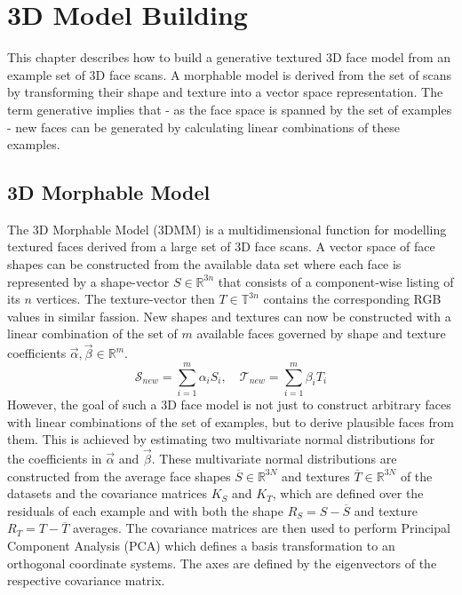 \chapter{3D Model Building}
\label{chap:modelbuilding}
This chapter describes how to build a generative textured 3D face model from an example set of 3D face scans. A morphable model is derived from the set of scans by transforming their shape and texture into a vector space representation. The term generative implies that - as the face space is spanned by the set of examples - new faces can be generated by calculating linear combinations of these examples. 

\section{3D Morphable Model}
The 3D Morphable Model (3DMM) \cite{3DMM} is a multidimensional function for modelling textured faces derived from a large set of 3D face scans. 
A vector space of face shapes can be constructed from the available data set where each face is represented by a shape-vector $S \in \mathbb{R}^{3n}$ that consists of a component-wise listing of its $n$ vertices. The texture-vector then $T \in
\mathbb{T}^{3n}$ contains the corresponding RGB values in similar fassion.
New shapes and textures can now be constructed with a linear combination of the set of $m$ available faces governed by shape and texture coefficients $\vec\alpha, \vec\beta \in \mathbb{R}^{m}$.
\begin{equation}
\label{eq:MM}
\mathcal{S}_{new}=\sum_{i=1}^{m}\alpha_{i}S_{i}, \quad \mathcal{T}_{new}=\sum_{i=1}^{m}\beta_{i}T_{i}
\end{equation}
However, the goal of such a 3D face model is not just to construct arbitrary faces with linear combinations of the set of examples, but to derive plausible faces from them. This is achieved by estimating two multivariate normal distributions for the coefficients in $\vec\alpha$ and $\vec\beta$.
These multivariate normal distributions are constructed from the average face shapes $\overline{S} \in \mathbb{R}^{3N}$ and textures $\overline{T} \in \mathbb{R}^{3N}$ of the datasets and the covariance matrices $K_{S}$ and $K_{T}$, which are defined over the residuals of each example and with both the shape $R_{S}=S-\overline{S}$ and texture $R_{T}=T-\overline{T}$ averages. The covariance matrices are then used to perform Principal Component Analysis (PCA)
which defines a basis transformation to an orthogonal coordinate systems. The axes are defined by the eigenvectors of the respective covariance matrix.
